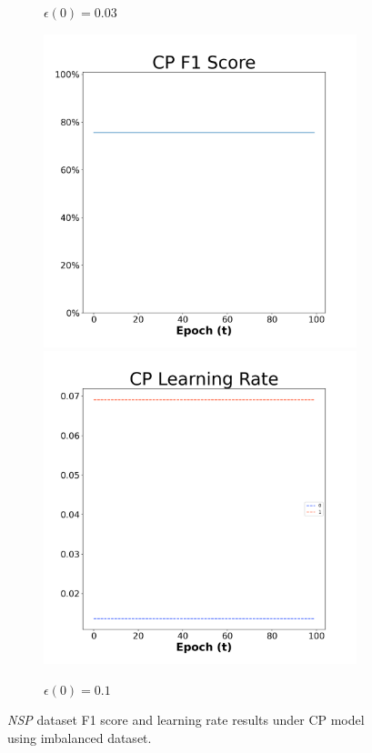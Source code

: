 \begin{figure}[H]
\begin{subfigure}{0.3\textwidth}
  \caption{$\epsilon(0)=0.03$}
\end{subfigure}\hfil %
\begin{subfigure}{0.3\textwidth}
  \includegraphics[width=\linewidth]{images/exper2/NSP/CP_0.1_f1.png}
  \includegraphics[width=\linewidth]{images/exper2/NSP/CP_0.1_lr.png}
  \caption{$\epsilon(0)=0.1$}
\end{subfigure}

\caption{\textit{NSP} dataset F1 score and learning rate results under CP model using imbalanced dataset.}
\end{figure}

